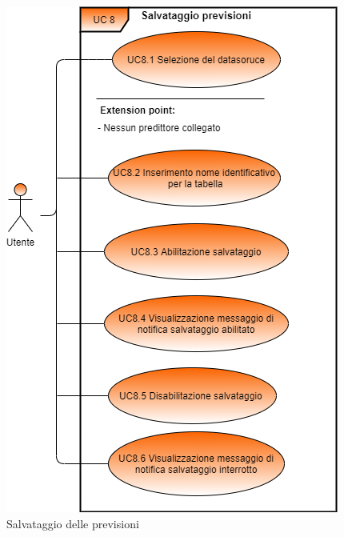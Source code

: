 	\begin{figure}[H]
		\centering
		\includegraphics[scale=0.70]{../Analisi_dei_requisiti/img/Diagrammi_UML/UC8_salvataggio_previsioni.png}
		\caption{Salvataggio delle previsioni} 
		\end{figure}	


